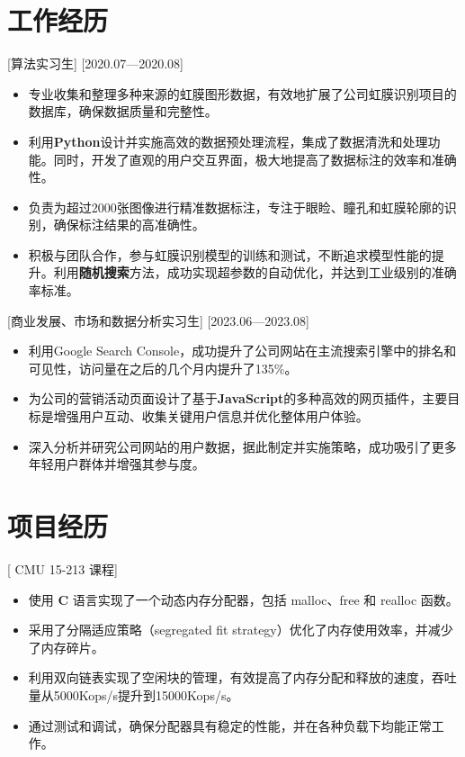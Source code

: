 \documentclass{resume}
\begin{document}
\section{工作经历}

[算法实习生]
[2020.07—2020.08]

\begin{itemize}
  \item 专业收集和整理多种来源的虹膜图形数据，有效地扩展了公司虹膜识别项目的数据库，确保数据质量和完整性。
  \item 利用\textbf{Python}设计并实施高效的数据预处理流程，集成了数据清洗和处理功能。同时，开发了直观的用户交互界面，极大地提高了数据标注的效率和准确性。
  \item 负责为超过2000张图像进行精准数据标注，专注于眼睑、瞳孔和虹膜轮廓的识别，确保标注结果的高准确性。
  \item 积极与团队合作，参与虹膜识别模型的训练和测试，不断追求模型性能的提升。利用\textbf{随机搜索}方法，成功实现超参数的自动优化，并达到工业级别的准确率标准。
\end{itemize}

[商业发展、市场和数据分析实习生]
[2023.06—2023.08]

\begin{itemize}
  \item 利用Google Search Console，成功提升了公司网站在主流搜索引擎中的排名和可见性，访问量在之后的几个月内提升了135\%。
  \item 为公司的营销活动页面设计了基于\textbf{JavaScript}的多种高效的网页插件，主要目标是增强用户互动、收集关键用户信息并优化整体用户体验。
  \item 深入分析并研究公司网站的用户数据，据此制定并实施策略，成功吸引了更多年轻用户群体并增强其参与度。
\end{itemize}

\section{项目经历}

[ \textnormal{CMU 15-213} 课程]
\begin{itemize}
  \item 使用 \textbf{C} 语言实现了一个动态内存分配器，包括 malloc、free 和 realloc 函数。
  \item 采用了分隔适应策略（segregated fit strategy）优化了内存使用效率，并减少了内存碎片。
  \item 利用双向链表实现了空闲块的管理，有效提高了内存分配和释放的速度，吞吐量从5000Kops/s提升到15000Kops/s。
  \item 通过测试和调试，确保分配器具有稳定的性能，并在各种负载下均能正常工作。
\end{itemize}
\end{document}
